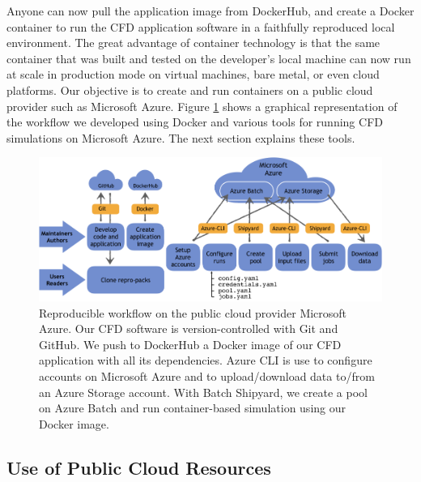 \documentclass[10pt,journal,compsoc]{IEEEtran}
\begin{document}
\noindent Anyone can now pull the application image from DockerHub, and create a Docker container to run the CFD application software in a faithfully reproduced local environment.
The great advantage of container technology is that the same container that was built and tested on the developer's local machine can now run at scale in production mode on virtual machines, bare metal, or even cloud platforms.
Our objective is to create and run containers on a public cloud provider such as Microsoft Azure.
Figure \ref{fig:cloud_workflow} shows a graphical representation of the workflow we developed using Docker and various tools for running CFD simulations on Microsoft Azure.
The next section explains these tools. 

\begin{figure}[t]
    \centering
    \includegraphics[width=16cm]{figures/cloud_workflow.png}
    \caption{Reproducible workflow on the public cloud provider Microsoft Azure. Our CFD software is version-controlled with Git and GitHub. We push to DockerHub a Docker image of our CFD application with all its dependencies. Azure CLI is use to configure accounts on Microsoft Azure and to upload/download data to/from an Azure Storage account. With Batch Shipyard, we create a pool on Azure Batch and run container-based simulation using our Docker image.}
    \label{fig:cloud_workflow}
\end{figure}

\subsection{Use of Public Cloud Resources}
\end{document}
